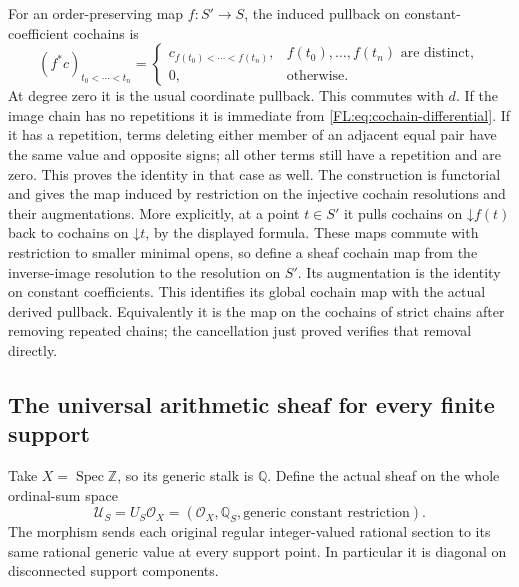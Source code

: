 \documentclass[11pt,a4paper]{article}
\theoremstyle{definition}\newtheorem{definition}[theorem]{Definition}
\newcommand{\Spec}{\operatorname{Spec}}\newcommand{\SpecMon}{\operatorname{Spec}_{\mathrm{mon}}}
\providecommand{\RQ}{\mathbb Q}
\begin{document}
For an order-preserving map $f:S'\to S$, the induced pullback on
constant-coefficient cochains is
\[
 (f^*c)_{t_0<\cdots<t_n}=
 \begin{cases}
 c_{f(t_0)<\cdots<f(t_n)},&f(t_0),\ldots,f(t_n)\text{ are distinct},\\
 0,&\text{otherwise}.
 \end{cases}
 \tag{FL16}\label{FL:eq:cochain-map}
\]
At degree zero it is the usual coordinate pullback. This commutes
with $d$. If the image chain has no repetitions it is immediate from
\eqref{FL:eq:cochain-differential}. If it has a repetition, terms deleting
either member of an adjacent equal pair have the same value and
opposite signs; all other terms still have a repetition and are zero.
This proves the identity in that case as well. The construction is
functorial and gives the map induced by restriction on the injective
cochain resolutions and their augmentations. More explicitly, at a
point $t\in S'$ it pulls cochains on $\mathord\downarrow f(t)$ back
to cochains on $\mathord\downarrow t$, by the displayed formula.
These maps commute with restriction to smaller minimal opens, so
define a sheaf cochain map from the inverse-image resolution to the
resolution on $S'$. Its augmentation is the identity on constant
coefficients. This identifies its global cochain map with the actual
derived pullback. Equivalently it is the
map on the cochains of strict chains after removing repeated chains;
the cancellation just proved verifies that removal directly.

\subsection{The universal arithmetic sheaf for every finite support}

Take $X=\Spec\mathbb Z$, so its generic stalk is $\RQ$. Define the
actual sheaf on the whole ordinal-sum space
\[
 \mathcal U_S=U_S\mathcal O_X
   =(\mathcal O_X,\RQ_S,\text{generic constant restriction}).
 \tag{FL17}\label{FL:eq:arithmetic-object}
\]
The morphism sends each original regular integer-valued rational
section to its same rational generic value at every support point.
In particular it is diagonal on disconnected support components.
\end{document}
